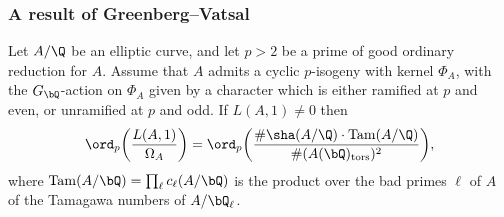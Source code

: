 \subsubsection{A result of Greenberg--Vatsal}


\begin{theorem}
\notready
\label{thmGV}
Let $A/\Q$ be an elliptic curve, and let $p>2$ be a prime of good ordinary reduction for $A$. Assume that $A$ admits a cyclic $p$-isogeny with kernel $\Phi_A$, with the $G_\bQ$-action on $\Phi_A$ given by a character which is either ramified at $p$ and even, or unramified at $p$ and odd. If $L(A,1)\neq 0$ then
\begin{displaymath}
\ord_{p}\biggl(\frac{L(A, 1)}{\Omega_{A}}\biggr)=\ord_{p}\biggl(\frac{\# \sha(A / \Q)\cdot{\rm Tam}(A/\Q)}{\#(A(\bQ)_{\rm tors})^2}\biggr),
\end{displaymath}
where ${\rm Tam}(A/\bQ)=\prod_{\ell} c_\ell(A/\bQ)$
is the product over the bad primes $\ell$ of $A$ of the Tamagawa numbers of $A/\bQ_\ell$.
\end{theorem}

